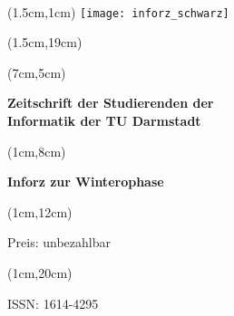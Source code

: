 \begin{titlepage}~


    \begin{textblock*}{12cm}(1.5cm,1cm)
        \texttt{[image: inforz\_schwarz]}
    \end{textblock*}


    \begin{textblock*}{12cm}(1.5cm,19cm)
    \end{textblock*}

    \begin{textblock*}{7cm}(7cm,5cm)
        \begin{flushright}
            \large\sffamily\textbf{
                \textcolor{.}{Zeitschrift der Studierenden der}\\
                \textcolor{.}{Informatik der TU Darmstadt}}
        \end{flushright}
    \end{textblock*}



    \begin{textblock*}{5cm}(1cm,8cm)
        \begin{rotate}{90}
            \sffamily\huge\textbf{
                \textcolor{.}{Inforz zur Winterophase \the\year}}
        \end{rotate}
    \end{textblock*}


    \begin{textblock*}{2cm}(1cm,12cm)
        \begin{rotate}{90}
            \sffamily\tiny \textcolor{.}{Preis: unbezahlbar}
        \end{rotate}
    \end{textblock*}


    \begin{textblock*}{2cm}(1cm,20cm)
        \begin{rotate}{90}
            \sffamily \textcolor{.}{ISSN: 1614-4295}
        \end{rotate}
    \end{textblock*}
\end{titlepage}
\newpage

